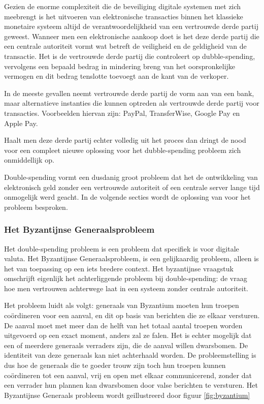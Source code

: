 			Gezien de enorme complexiteit die de beveiliging digitale systemen met zich meebrengt is het uitvoeren van elektronische transacties binnen het klassieke monetaire systeem altijd de verantwoordelijkheid van een vertrouwde derde partij geweest. Wanneer men een elektronische aankoop doet is het deze derde partij die een centrale autoriteit vormt wat betreft de veiligheid en de geldigheid van de transactie. Het is de vertrouwde derde partij die controleert op dubble-spending, vervolgens een bepaald bedrag in mindering breng van het oorspronkelijke vermogen en dit bedrag tenslotte toevoegt aan de kant van de verkoper. 
			
			In de meeste gevallen neemt vertrouwde derde partij de vorm aan van een bank, maar alternatieve instanties die kunnen optreden als vertrouwde derde partij voor transacties. Voorbeelden hiervan zijn: PayPal, TransferWise, Google Pay en Apple Pay.
		
			Haalt men deze derde partij echter volledig uit het proces dan dringt de nood voor een compleet nieuwe oplossing voor het dubble-spending probleem zich onmiddellijk op.
			
			Double-spending vormt een dusdanig groot probleem dat het de ontwikkeling van elektronisch geld zonder een vertrouwde autoriteit of een centrale server lange tijd onmogelijk werd geacht. In de volgende secties wordt de oplossing van \textcite{Nakamoto2008} voor het probleem besproken. 
			
			\subsubsection{Het Byzantijnse Generaalsprobleem}
			Het double-spending probleem is een probleem dat specifiek is voor digitale valuta. Het Byzantijnse Generaalsprobleem, is een gelijkaardig probleem, alleen is het van toepassing op een iets bredere context. Het byzantijnse vraagstuk omschrijft eigenlijk het achterliggende probleem bij double-spending: de vraag hoe men vertrouwen achterwege laat in een systeem zonder centrale autoriteit.
			
			Het probleem luidt als volgt: generaals van Byzantium moeten hun troepen coördineren voor een aanval, en dit op basis van berichten die ze elkaar versturen. De aanval moet met meer dan de helft van het totaal aantal troepen worden uitgevoerd op een exact moment, anders zal ze falen. Het is echter mogelijk dat een of meerdere generaals verraders zijn, die de aanval willen dwarsbomen. De identiteit van deze generaals kan niet achterhaald worden. De probleemstelling is dus hoe de generaals die te goeder trouw zijn toch hun troepen kunnen coördineren tot een aanval, vrij en open met elkaar communicerend, zonder dat een verrader hun plannen kan dwarsbomen door valse berichten te versturen. Het Byzantijnse Generaals probleem wordt geillustreerd door figuur \ref{fig:byzantium}
			
